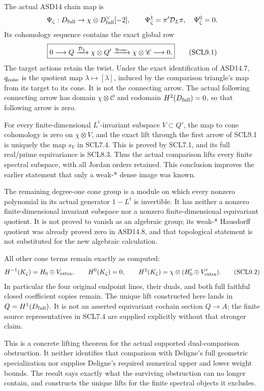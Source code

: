 The actual ASD14 chain map is \[
 \Psi_\zeta:D_{\rm full}\to\chi\otimes D_{\rm full}^\vee[-2],
 \qquad \Psi_\zeta^1=\pi'\mathcal D_L\pi,\quad\Psi_\zeta^0=0.
\] Its cohomology sequence contains the exact global row \[
 \boxed{
 0\longrightarrow Q\xrightarrow{\mathcal D_L}
 \chi\otimes Q'\xrightarrow{q_{\rm cone}}
 \chi\otimes\mathscr C\longrightarrow0.}
 \tag{SCL9.1}
\] The target actions retain the twist. Under the exact identification
of ASD14.7, \(q_{\rm cone}\) is the quotient map
\(\lambda\mapsto[\lambda]\), induced by the comparison triangle's map
from its target to its cone. It is not the connecting arrow. The actual
following connecting arrow has domain \(\chi\otimes\mathscr C\) and
codomain \(H^2(D_{\rm full})=0\), so that following arrow is zero.

For every finite-dimensional \(L^t\)-invariant subspace \(V\subset Q'\),
the map to cone cohomology is zero on \(\chi\otimes V\), and the exact
lift through the first arrow of SCL9.1 is uniquely the map \(s_V\) in
SCL7.4. This is proved by SCL7.1, and its full real/prime equivariance
is SCL8.3. Thus the actual comparison lifts every finite spectral
subspace, with all Jordan orders retained. This conclusion improves the
earlier statement that only a weak-* dense image was known.

The remaining degree-one cone group is a module on which every nonzero
polynomial in its actual generator \(1-L^t\) is invertible. It has
neither a nonzero finite-dimensional invariant subspace nor a nonzero
finite-dimensional equivariant quotient. It is not proved to vanish as
an algebraic group; its weak-* Hausdorff quotient was already proved
zero in ASD14.8, and that topological statement is not substituted for
the new algebraic calculation.

All other cone terms remain exactly as computed: \[
 H^{-1}(K_\zeta)=H_0\oplus V_{\rm extra},\qquad
 H^0(K_\zeta)=0,\qquad
 H^2(K_\zeta)=\chi\otimes(H_0'\oplus V_{\rm extra}').
 \tag{SCL9.2}
\] In particular the four original endpoint lines, their duals, and both
full faithful closed coefficient copies remain. The unique lift
constructed here lands in \(Q=H^1(D_{\rm full})\). It is not an asserted
equivariant cochain section \(Q\to A\); the finite source
representatives in SCL7.4 are supplied explicitly without that stronger
claim.

This is a concrete lifting theorem for the actual supported
dual-comparison obstruction. It neither identifies that comparison with
Deligne's full geometric specialization nor supplies Deligne's required
numerical upper and lower weight bounds. The result says exactly what
the surviving obstruction can no longer contain, and constructs the
unique lifts for the finite spectral objects it excludes.
